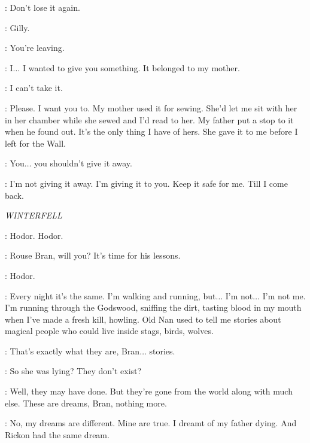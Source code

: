 \JEOR: Don't lose it again. 


\SAM: Gilly. 

\GILLY: You're leaving. 

\SAM: I$\ldots$ I wanted to give you something. It belonged to my mother. 


\GILLY: I can't take it. 

\SAM: Please. I want you to. My mother used it for sewing. She'd let me sit with her in her chamber while she sewed and I'd read to her. My father put a stop to it when he found out. It's the only thing I have of hers. She gave it to me before I left for the Wall. 

\GILLY: You$\ldots$ you shouldn't give it away. 

\SAM: I'm not giving it away. I'm giving it to you. Keep it safe for me. Till I come back. 



\scene

\textit{WINTERFELL} 


\HODOR: Hodor. Hodor. 

\LUWIN: Rouse Bran, will you? It's time for his lessons. 


\HODOR: Hodor. 


\BRAN: Every night it's the same. I'm walking and running, but$\ldots$ I'm not$\ldots$ I'm not me. I'm running through the Godswood, sniffing the dirt, tasting blood in my mouth when I've made a fresh kill, howling. Old Nan used to tell me stories about magical people who could live inside stags, birds, wolves. 

\LUWIN: That's exactly what they are, Bran$\ldots$ stories. 

\BRAN: So she was lying? They don't exist? 

\LUWIN: Well, they may have done. But they're gone from the world along with much else. These are dreams, Bran, nothing more. 

\BRAN: No, my dreams are different. Mine are true. I dreamt of my father dying. And Rickon had the same dream. 

